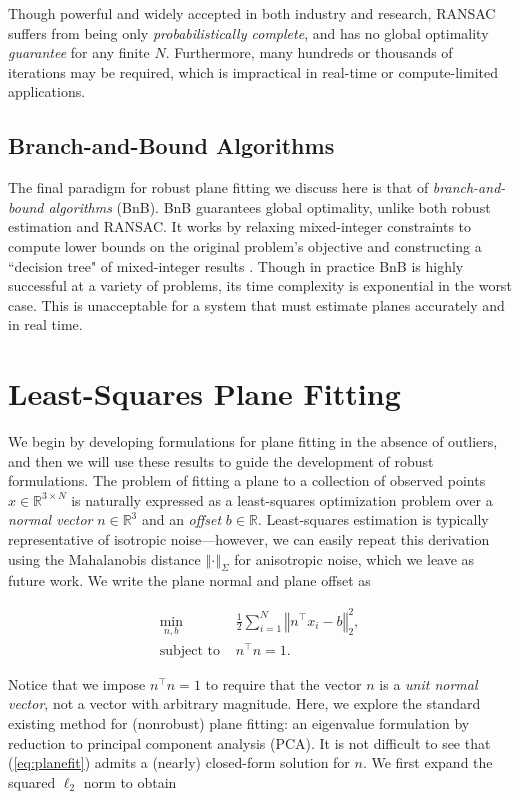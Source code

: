 \documentclass[conference]{IEEEtran}
\begin{document}
Though powerful and widely accepted in both industry and research, RANSAC suffers from being only \textit{probabilistically complete}, and has no global optimality \textit{guarantee} for any finite \( N \).  Furthermore, many hundreds or thousands of iterations may be required, which is impractical in real-time or compute-limited applications.

\subsection{Branch-and-Bound Algorithms}

The final paradigm for robust plane fitting we discuss here is that of \textit{branch-and-bound algorithms} (BnB).  BnB guarantees global optimality, unlike both robust estimation and RANSAC.  It works by relaxing mixed-integer constraints to compute lower bounds on the original problem's objective and constructing a ``decision tree" of mixed-integer results \cite{bnb}.  Though in practice BnB is highly successful at a variety of problems, its time complexity is exponential in the worst case.  This is unacceptable for a system that must estimate planes accurately and in real time.

\section{Least-Squares Plane Fitting}

We begin by developing formulations for plane fitting in the absence of outliers, and then we will use these results to guide the development of robust formulations.  The problem of fitting a plane to a collection of observed points \( x \in \mathbb{R}^{3 \times N} \) is naturally expressed as a least-squares optimization problem over a \textit{normal vector} \( n \in \mathbb{R}^3 \) and an \textit{offset} \( b \in \mathbb{R} \).  Least-squares estimation is typically representative of isotropic noise---however, we can easily repeat this derivation using the Mahalanobis distance \( \left\Vert \cdot \right\Vert_\Sigma \) for anisotropic noise, which we leave as future work.  We write the plane normal and plane offset as

\begin{align}
	\min_{n, b} \; & \frac12 \sum_{i = 1}^N \left\Vert n^\top x_i - b \right\Vert_2^2 , \\
	\text{subject to } & n^\top n = 1.
	\label{eq:planefit}
\end{align}

Notice that we impose \( n^\top n = 1 \) to require that the vector \( n \) is a \textit{unit normal vector}, not a vector with arbitrary magnitude.  Here, we explore the standard existing method for (nonrobust) plane fitting: an eigenvalue formulation by reduction to principal component analysis (PCA).  It is not difficult to see that (\ref{eq:planefit}) admits a (nearly) closed-form solution for \( n \).  We first expand the squared \( \ell_2 \) norm to obtain
\end{document}
